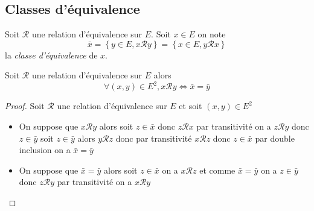 \documentclass[11pt,colorlinks]{book}
\theoremstyle{mytheoremstyle}
\theoremstyle{mytheoremstyle}
\theoremstyle{mytheoremstyle}
\theoremstyle{mytheoremstyle}
\theoremstyle{mytheoremstyle}
\theoremstyle{mytheoremstyle}
\theoremstyle{mytheoremstyle}
\theoremstyle{mytheoremstyle}
\theoremstyle{myproblemstyle}
\def\mfc#1{\mathcal{#1}}
\def\mR{\mfc{R}}
\begin{document}
\subsection{Classes d'équivalence}
\begin{definition}
  Soit $\mR$ une relation d'équivalence sur $E$. Soit $x \in E$ on note
  \begin{equation*}
    \bar{x} = \left\{y \in E, x\mR y\right\} = \left\{x \in E, y\mR x \right\}
  \end{equation*}
  la \textit{classe d'équivalence} de $x$.
\end{definition}
\begin{prop}
  Soit $\mR$ une relation d'équivalence sur $E$ alors 
  \begin{equation*}
    \forall (x,y) \in E^2, x\mR y \Leftrightarrow \bar{x} =\bar{y}
  \end{equation*}
  \begin{proof}
    Soit $\mR$ une relation d'équivalence sur $E$ et soit $(x,y) \in E^2$ 
    \begin{itemize}
      \item On suppose que $x \mR y$ alors soit $z \in \bar{x}$ donc $z\mR x$ par transitivité on a $z \mR y$ donc $z \in \bar{y}$ 
      soit $z \in \bar{y}$ alors $y \mR z$ donc par transitivité $x \mR z$ donc $z \in \bar{x}$ par double inclusion on a $\bar{x} = \bar{y}$
      \item On suppose que $\bar{x} = \bar{y}$ alors soit $z \in \bar{x}$ on a $x \mR z$ et comme $\bar{x} = \bar{y}$ on a $z \in \bar{y}$ donc $z \mR y$ par transitivité on a $x \mR y$
    \end{itemize}
  \end{proof}
\end{prop}
\end{document}
